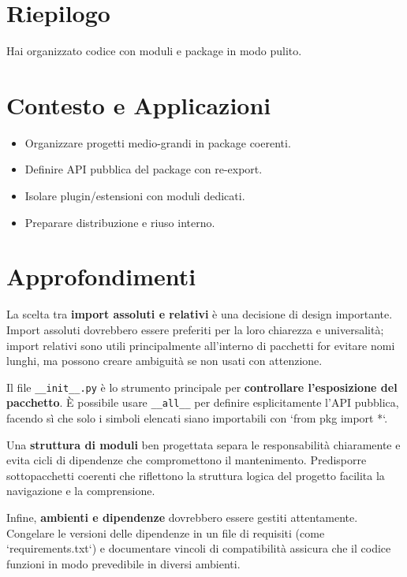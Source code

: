 \section{Riepilogo}
Hai organizzato codice con moduli e package in modo pulito.

\section{Contesto e Applicazioni}
\begin{tcolorbox}[title=Contesto e Applicazioni]
\begin{itemize}
  \item Organizzare progetti medio-grandi in package coerenti.
  \item Definire API pubblica del package con re-export.
  \item Isolare plugin/estensioni con moduli dedicati.
  \item Preparare distribuzione e riuso interno.
\end{itemize}
\end{tcolorbox}

\section{Approfondimenti}
\begin{tcolorbox}[title=Spiegazioni dettagliate]
La scelta tra \textbf{import assoluti e relativi} è una decisione di design importante. Import assoluti dovrebbero essere preferiti per la loro chiarezza e universalità; import relativi sono utili principalmente all'interno di pacchetti for evitare nomi lunghi, ma possono creare ambiguità se non usati con attenzione.

Il file \verb|__init__.py| è lo strumento principale per \textbf{controllare l'esposizione del pacchetto}. È possibile usare \verb|__all__| per definire esplicitamente l'API pubblica, facendo sì che solo i simboli elencati siano importabili con `from pkg import *`.

Una \textbf{struttura di moduli} ben progettata separa le responsabilità chiaramente e evita cicli di dipendenze che compromettono il mantenimento. Predisporre sottopacchetti coerenti che riflettono la struttura logica del progetto facilita la navigazione e la comprensione.

Infine, \textbf{ambienti e dipendenze} dovrebbero essere gestiti attentamente. Congelare le versioni delle dipendenze in un file di requisiti (come `requirements.txt`) e documentare vincoli di compatibilità assicura che il codice funzioni in modo prevedibile in diversi ambienti.
\end{tcolorbox}

